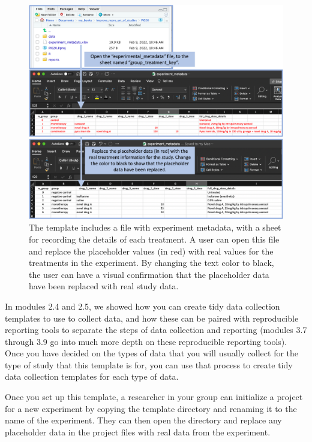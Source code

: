 \documentclass[]{tufte-book}
\begin{document}
\begin{figure}
\includegraphics[width=\textwidth]{figures/project_replacing_placeholder_treatment_data} \caption[The template includes a file with experiment metadata, with a sheet for recording the details of each treatment]{The template includes a file with experiment metadata, with a sheet for recording the details of each treatment. A user can open this file and replace the placeholder values (in red) with real values for the treatments in the experiment. By changing the text color to black, the user can have a visual confirmation that the placeholder data have been replaced with real study data.}\label{fig:replacingplaceholdertreatment}
\end{figure}

In modules 2.4 and 2.5, we showed how you can create tidy data collection
templates to use to collect data, and how these can be paired with reproducible
reporting tools to separate the steps of data collection and reporting (modules
3.7 through 3.9 go into much more depth on these reproducible reporting tools).
Once you have decided on the types of data that you will usually collect for the
type of study that this template is for, you can use that process to create tidy
data collection templates for each type of data.

Once you set up this template, a researcher in your group can initialize a project
for a new experiment by copying the template directory and renaming it to the name
of the experiment. They can then open the directory and replace any placeholder
data in the project files with real data from the experiment.
\end{document}
